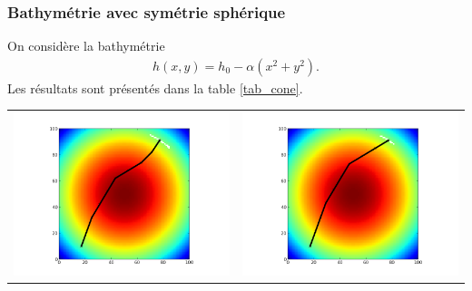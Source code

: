 \subsubsection{Bathymétrie avec symétrie sphérique}
On considère la bathymétrie
\begin{align*}
h(x,y)=h_0-\alpha (x^2+y^2).
\end{align*}
 Les résultats sont présentés dans la table \ref{tab_cone}.
\begin{table}
\begin{tabular}{cc}
\includegraphics[scale=0.42]{../data/greedy_cone_2/plot_A_10_17_B_91_77_iteration_010.png} &
\includegraphics[scale=0.42]{../data/anneaux_cone_2/plot_A_10_17_B_91_77_iteration_009.png} \\

\end{tabular}
\end{table}
